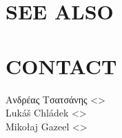 \documentclass[a4paper,english]{article}
\begin{document}
\begin{adjustwidth}{18pt}{0pt}
    \section{SEE ALSO}



    \section{CONTACT}
    Ανδρέας Τσατσάνης <>\\[0.1cm]\MANbr
    Lukáš Chládek <>\\[0.1cm]\MANbr
    Mikołaj Gazeel <>\\[0.1cm]\MANbr

\end{adjustwidth}
\end{document}
